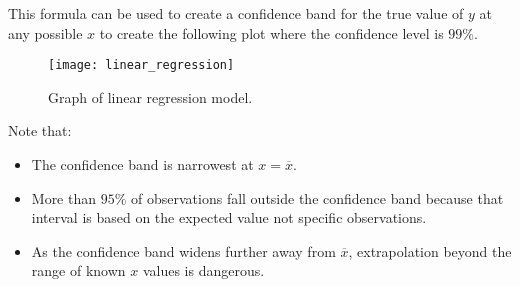 \documentclass{article}
\begin{document}
This formula can be used to create a confidence band for the true value of 
\(y\) at any possible \(x\) to create the following plot where the confidence level is \(99\% \).
\begin{figure}[H]
    \centering
    \texttt{[image: linear\_regression]}
    \caption{Graph of linear regression model.}
\end{figure}
Note that:
\begin{itemize}
    \item The confidence band is narrowest at \(x = \overline{x}\).
    \item More than \(95\%\) of observations fall outside the confidence band because that interval is based on the expected value not specific observations.
    \item As the confidence band widens further away from \(\overline{x}\), extrapolation beyond the range of known \(x\) values is dangerous.
\end{itemize}
\end{document}
